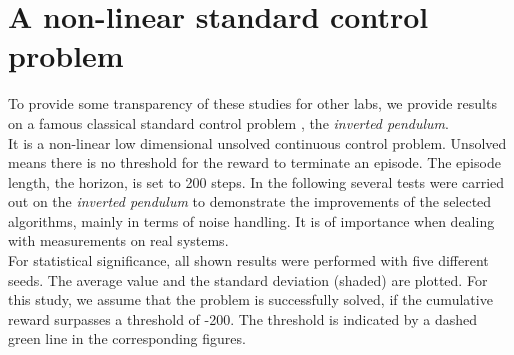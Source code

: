 \documentclass[
reprint,
amsmath,amssymb,amsfonts,clevref,
aps,
prstab,
]{revtex4-2}
\begin{document}
	\section{A non-linear standard control problem}
	To provide some transparency of these studies for other labs, we provide results on a famous classical standard control problem \cite{Furutaa}, the \emph{inverted pendulum}.\\
	 It is a non-linear low dimensional unsolved continuous control problem. Unsolved means there is no threshold for the reward to terminate an episode. The episode length, the horizon, is set to 200 steps. In the following several tests were carried out on the \emph{inverted pendulum} to demonstrate the improvements of the selected algorithms, mainly in terms of noise handling. It is of importance when dealing with measurements on real systems.\\
	 For statistical significance, all shown results were performed with five different seeds. The average value and the standard deviation (shaded) are plotted. For this study, we assume that the problem is successfully solved, if the cumulative reward surpasses a threshold of -200. The threshold is indicated by a dashed green line in the corresponding figures.
	
\end{document}
